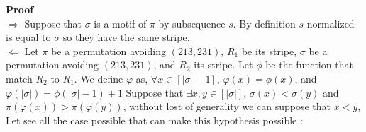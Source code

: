 \documentclass[a4paper]{llncs}
\newcommand{\ptext}{\pi}
\newcommand{\pmotif}{\sigma}
\begin{document}
		\textbf{Proof} \\
		$\Rightarrow$ Suppose that $\pmotif$ is a motif of $\ptext$
		by subsequence $s$.
		By definition $s$ normalized is equal to
		$\pmotif$ so they have the same stripe.\\ 
		$\Leftarrow$ 
		Let $\ptext$ be a permutation avoiding $(213,231)$, 
		$R_1$ be its stripe, 
		$\pmotif$  be a permutation avoiding $(213,231)$, 
		and $R_2$ its stripe.
		Let $\phi$ be the function
		that match $R_2$ to $R_1$.
		We define $\varphi$ as, 
		$\forall x \in [|\pmotif|-1]$,
		$\varphi(x) = \phi(x)$,
		and $\varphi(|\pmotif|) = \phi(|\pmotif|-1)+1$
		Suppose that $\exists x,y \in [|\pmotif|]$, 
		$\pmotif(x)<\pmotif(y)$ 
		and $\ptext(\varphi(x))>\ptext(\varphi(y))$,
		without lost of generality we can suppose that $x<y$,
		Let see all the case possible that can make this 
		hypothesis possible :
\end{document}
